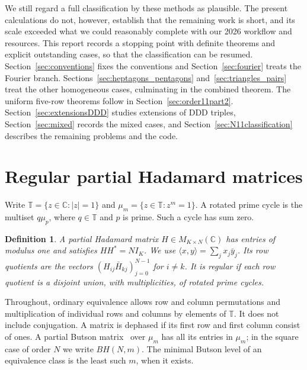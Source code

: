 \documentclass[11pt,a4paper]{article}
\theoremstyle{plain}
\newtheorem{definition}[theorem]{Definition}
\theoremstyle{definition}
\theoremstyle{plain}
\begin{document}
We still regard a full classification by these methods as plausible. The present calculations do not, however, establish that the remaining work is short, and its scale exceeded what we could reasonably complete with our 2026 workflow and resources. This report records a stopping point with definite theorems and explicit outstanding cases, so that the classification can be resumed. Section~\ref{sec:conventions} fixes the conventions and Section~\ref{sec:fourier} treats the Fourier branch. Sections~\ref{sec:heptagons_pentagons} and~\ref{sec:triangles_pairs} treat the other homogeneous cases, culminating in the combined theorem. The uniform five-row theorems follow in Section~\ref{sec:order11part2}. Section~\ref{sec:extensionsDDD} studies extensions of $\mathrm{DDD}$ triples, Section~\ref{sec:mixed} records the mixed cases, and Section~\ref{sec:N11classification} describes the remaining problems and the code.


\section{Regular partial Hadamard matrices}\label{sec:order11part1}\label{sec:conventions}
Write $\mathbb T=\{z\in\mathbb C:|z|=1\}$ and $\mu_m=\{z\in\mathbb T:z^m=1\}$. A rotated prime cycle is the multiset $q\mu_p$, where $q\in\mathbb T$ and $p$ is prime. Such a cycle has sum zero.

\par\addvspace{\medskipamount}\noindent
\begin{minipage}{\linewidth}
\begin{definition}
A partial Hadamard matrix $H\in M_{K\times N}(\mathbb C)$ has entries of modulus one and satisfies $HH^*=NI_K$. We use $\langle x,y\rangle=\sum_j x_j\bar y_j$. Its row quotients are the vectors $(H_{ij}\bar H_{kj})_{j=0}^{N-1}$ for $i\ne k$. It is regular if each row quotient is a disjoint union, with multiplicities, of rotated prime cycles.
\end{definition}
\end{minipage}
\par\addvspace{\medskipamount}

Throughout, ordinary equivalence allows row and column permutations and multiplication of individual rows and columns by elements of $\mathbb T$. It does not include conjugation. A matrix is dephased if its first row and first column consist of ones. A partial Butson matrix~\cite{but} over $\mu_m$ has all its entries in $\mu_m$; in the square case of order $N$ we write $BH(N,m)$. The minimal Butson level of an equivalence class is the least such $m$, when it exists.
\end{document}
